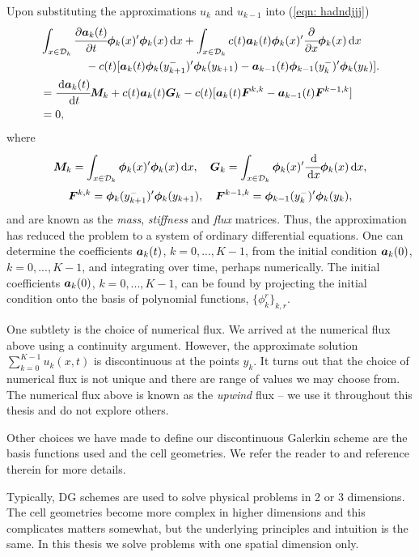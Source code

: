 Upon substituting the approximations \(u_k\) and \(u_{k-1}\) into (\ref{eqn: hadndjjj}) 
\begin{align}
	&\int_{x\in \mathcal{D}_k}\cfrac{\partial\boldsymbol a_k(t)}{\partial t}\boldsymbol \phi_k(x)'{}\boldsymbol\phi_k(x)\, \mathrm{d} x + \int_{x\in \mathcal{D}_k} c(t) \boldsymbol a_k(t)\boldsymbol\phi_k(x)'{}\cfrac{\partial}{\partial x} \boldsymbol \phi_k( x)\, \mathrm{d} x \nonumber
	\\&\qquad\qquad{}- c(t)[\boldsymbol a_k(t)\boldsymbol\phi_k(y_{k+1}^-)'{}\boldsymbol \phi_k(y_{k+1}) - \boldsymbol a_{k-1}(t)\boldsymbol\phi_{k-1}(y_{k}^-)'{}\boldsymbol \phi_k(y_{k})].\nonumber
	\\&=\cfrac{\, \mathrm{d} \boldsymbol a_k(t)}{\, \mathrm{d} t}\boldsymbol M_k + c(t) \boldsymbol a_k(t)\boldsymbol G_k - c(t)[\boldsymbol a_k(t)\boldsymbol F^{k,k} - \boldsymbol a_{k-1}(t)\boldsymbol F^{k-1,k}]\nonumber
	\\&= 0,\label{eqn: hadndj}
\end{align}
where 
\[\boldsymbol M_k = \int_{x\in\mathcal{D}_k}\boldsymbol \phi_k(x)'{}\boldsymbol \phi_k(x)\, \mathrm{d} x,\quad \boldsymbol G_k = \int_{x\in\mathcal{D}_k}\boldsymbol \phi_k(x)'{}\cfrac{\, \mathrm{d}}{\, \mathrm{d} x} \boldsymbol \phi_k(x)\, \mathrm{d} x,\]
\[\boldsymbol F^{k,k} = \boldsymbol\phi_k(y_{k+1}^-)'{}\boldsymbol \phi_k(y_{k+1}),\quad \boldsymbol F^{k-1,k} = \boldsymbol\phi_{k-1}(y_{k}^-)'{}\boldsymbol \phi_k(y_{k}),\]
and are known as the \emph{mass}, \emph{stiffness} and \emph{flux} matrices. Thus, the approximation has reduced the problem to a system of ordinary differential equations. One can determine the coefficients \(\boldsymbol a_k(t)\), \(k=0,...,K-1\), from the initial condition \(\boldsymbol a_k(0)\), \(k=0,...,K-1\), and integrating over time, perhaps numerically. The initial coefficients \(\boldsymbol a_k(0)\), \(k=0,...,K-1\), can be found by projecting the initial condition onto the basis of polynomial functions, \(\{\phi_k^r\}_{k,r}\). 

One subtlety is the choice of numerical flux. We arrived at the numerical flux above using a continuity argument. However, the approximate solution \(\sum_{k=0}^{K-1}u_k(x,t)\) is discontinuous at the points \({y_{k}}\). It turns out that the choice of numerical flux is not unique and there are range of values we may choose from. The numerical flux above is known as the \emph{upwind} flux -- we use it throughout this thesis and do not explore others. 

Other choices we have made to define our discontinuous Galerkin scheme are the basis functions used and the cell geometries. We refer the reader to \citep{nodalDGBook} and reference therein for more details. 

Typically, DG schemes are used to solve physical problems in 2 or 3 dimensions. The cell geometries become more complex in higher dimensions and this complicates matters somewhat, but the underlying principles and intuition is the same. In this thesis we solve problems with one spatial dimension only.

